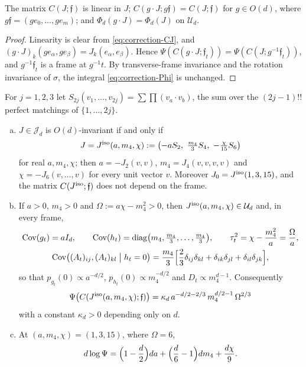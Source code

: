 \begin{lemma}[rotations]\label{lem:correction-rot}
The matrix $C(J;\mathfrak f)$ is linear in $J$; $C(g\cdot J;g\mathfrak f)=C(J;\mathfrak f)$ for $g\in O(d)$, where $g\mathfrak f=(ge_0,\dots,ge_m)$; and $\Phi_d(g\cdot J)=\Phi_d(J)$ on $\mathcal U_d$.
\end{lemma}

\begin{proof}
Linearity is clear from \eqref{eq:correction-CJ}, and $(g\cdot J)_k(ge_\alpha,ge_\beta)=J_k(e_\alpha,e_\beta)$. Hence $\Psi(C(g\cdot J;\mathfrak f_t))=\Psi(C(J;g^{-1}\mathfrak f_t))$, and $g^{-1}\mathfrak f_t$ is a frame at $g^{-1}t$. By transverse-frame invariance and the rotation invariance of $\sigma$, the integral \eqref{eq:correction-Phi} is unchanged.
\end{proof}

\begin{lemma}\label{lem:correction-iso}
For $j=1,2,3$ let $S_{2j}(v_1,\dots,v_{2j})=\sum\prod(v_a\cdot v_b)$, the sum over the $(2j-1)!!$ perfect matchings of $\{1,\dots,2j\}$.
\begin{enumerate}[(a)]
\item $J\in\mathcal J_d$ is $O(d)$-invariant if and only if
\begin{equation}\label{eq:correction-Jiso}
J=J^{\rm iso}(a,m_4,\chi):=\bigl(-aS_2,\ \tfrac{m_4}3S_4,\ -\tfrac{\chi}{15}S_6\bigr)
\end{equation}
for real $a,m_4,\chi$; then $a=-J_2(v,v)$, $m_4=J_4(v,v,v,v)$ and $\chi=-J_6(v,\dots,v)$ for every unit vector $v$. Moreover $J_0=J^{\rm iso}(1,3,15)$, and the matrix $C(J^{\rm iso};\mathfrak f)$ does not depend on the frame.
\item If $a>0$, $m_4>0$ and $\Omega:=a\chi-m_4^2>0$, then $J^{\rm iso}(a,m_4,\chi)\in\mathcal U_d$ and, in every frame,
\begin{gather}
\operatorname{Cov}(g_t)=aI_d,\qquad \operatorname{Cov}(h_t)=\operatorname{diag}\bigl(m_4,\tfrac{m_4}3,\dots,\tfrac{m_4}3\bigr),\qquad \tau_t^2=\chi-\frac{m_4^2}a=\frac\Omega a,\notag\\
\operatorname{Cov}\bigl((A_t)_{ij},(A_t)_{kl}\bigm| h_t=0\bigr)=\frac{m_4}3\Bigl[\frac23\delta_{ij}\delta_{kl}+\delta_{ik}\delta_{jl}+\delta_{il}\delta_{jk}\Bigr],\label{eq:correction-isocond}
\end{gather}
so that $p_{g_t}(0)\propto a^{-d/2}$, $p_{h_t}(0)\propto m_4^{-d/2}$ and $D_t\propto m_4^{d-1}$. Consequently
\begin{equation}\label{eq:correction-isoPsi}
\Psi\bigl(C(J^{\rm iso}(a,m_4,\chi);\mathfrak f)\bigr)=\kappa_d\,a^{-d/2-2/3}\,m_4^{d/2-1}\,\Omega^{2/3}
\end{equation}
with a constant $\kappa_d>0$ depending only on $d$.
\item At $(a,m_4,\chi)=(1,3,15)$, where $\Omega=6$,
\begin{equation}\label{eq:correction-isodiff}
d\log\Psi=\Bigl(1-\frac d2\Bigr)da+\Bigl(\frac d6-1\Bigr)dm_4+\frac{d\chi}9 .
\end{equation}
\end{enumerate}
\end{lemma}

